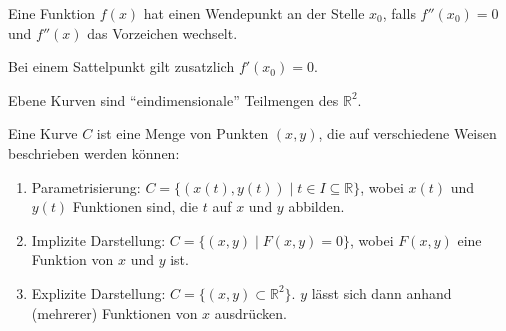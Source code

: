 \documentclass[12pt]{article}
\newcommand{\R}{\mathbb{R}} %
\newenvironment{definition}[2][Definition]{\begin{trivlist}
        \item[\hskip \labelsep {\bfseries #1}\hskip \labelsep {\bfseries #2.}]}{\flushright{$\square$}\end{trivlist}}
\newenvironment{remark}[2][Bemerkung]{\begin{trivlist}
        \item[\hskip \labelsep {\bfseries #1}\hskip \labelsep {\bfseries #2.}]}{\end{trivlist}}
\begin{document}
\begin{definition}{[Wendepunkte]}
        Eine Funktion $f(x)$ hat einen Wendepunkt an der Stelle $x_0$, falls $f''(x_0)=0$ und $f''(x)$ das Vorzeichen wechselt.

        \begin{remark}{[Wendepunkte und Sattelpunkte]}
                Bei einem Sattelpunkt gilt zusatzlich $f'(x_0)=0$.
        \end{remark}
\end{definition}

\begin{definition}{[Ebene Kurven]}
        Ebene Kurven sind ``eindimensionale'' Teilmengen des $\R^2$.

        Eine Kurve $C$ ist eine Menge von Punkten $(x,y)$, die auf verschiedene Weisen
        beschrieben werden können:
        \begin{enumerate}
                \item Parametrisierung: $C=\{(x(t),y(t))\mid t\in I\subseteq\R\}$, wobei $x(t)$ und $y(t)$
                      Funktionen sind, die $t$ auf $x$ und $y$ abbilden.
                \item Implizite Darstellung: $C=\{(x,y)\mid F(x,y)=0\}$, wobei $F(x,y)$ eine Funktion
                      von $x$ und $y$ ist.
                \item Explizite Darstellung: $C=\{(x,y)\subset\R^2\}$. $y$ lässt sich dann anhand (mehrerer) Funktionen von $x$ ausdrücken.
                

\end{enumerate}
\end{definition}
\end{document}
